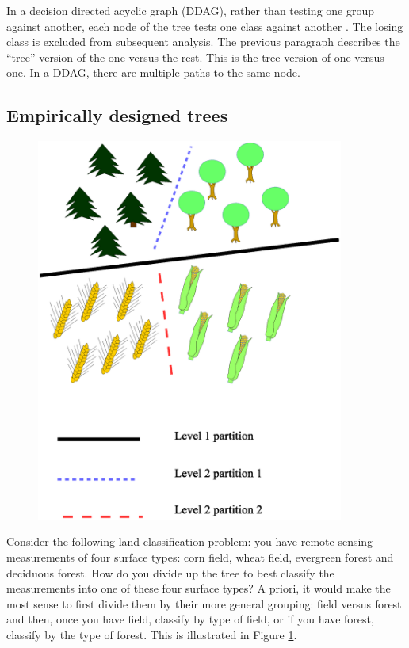 \documentclass{article}
\begin{document}
In a decision directed acyclic graph (DDAG), 
rather than testing one group against another, 
each node of the tree tests one class against another \citep{Platt_etal2000}. 
The losing class is excluded from subsequent analysis. 
The previous paragraph describes the ``tree'' version of the one-versus-the-rest. 
This is the tree version of one-versus-one. 
In a DDAG, there are multiple paths to the same node.

\subsection{Empirically designed trees}

\label{empirical}

\begin{figure}
	\includegraphics[width=0.9\textwidth]{landclasstree.eps}
	\label{landclasstree}
\end{figure}

Consider the following land-classification problem: you have remote-sensing measurements of four surface types: corn field, wheat field, evergreen forest and deciduous forest.
How do you divide up the tree to best classify the measurements into one of these four surface types?
A priori, it would make the most sense to first divide them by their more general grouping: field versus forest and then, once you have field, classify by type of field, or if you have forest, classify by the type of forest.
This is illustrated in Figure \ref{landclasstree}.
\end{document}
